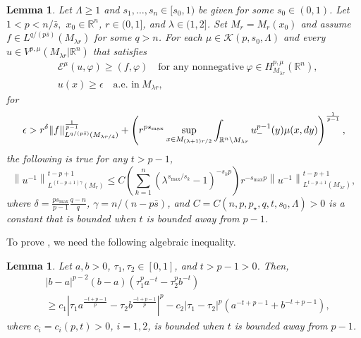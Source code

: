 \documentclass[11pt]{amsart}
\theoremstyle{plain}
\newtheorem{lemma}[theorem]{Lemma}
\theoremstyle{definition}
\numberwithin{equation}{section}
\renewcommand{\d}{\textnormal{d}}
\newcommand{\R}{\mathbb{R}}
\begin{document}
\begin{lemma} \label{lem:iteration}
Let $\Lambda \ge 1$ and $s_1,\dots,s_n\in[s_0,1)$ be given for some $s_0\in(0,1)$. Let $1<p<  n/\bar{s},$ $x_0 \in \R^n$, $r\in(0,1]$, and $\lambda \in (1,2]$. Set $M_r = M_r(x_0)$ and assume $f\in L^{q/(p\bar{s})}(M_{\lambda r})$ for some $q>n$. 
For each $\mu \in \mathcal{K}(p,s_0, \Lambda)$ and every $u \in V^{p,\mu}(M_{\lambda r} | \R^n)$ that satisfies 
\begin{align*}
&\mathcal{E}^\mu(u, \varphi) \geq (f, \varphi) \quad \text{for any nonnegative}~ \varphi \in H^{p,\mu}_{M_{\lambda r}}(\R^n), \\
&u(x) \geq \epsilon \quad \text{a.e. in}~ M_{\lambda r},
\end{align*}
for
\begin{equation*}
\epsilon > r^{\delta}\|f\|_{L^{q/(p\bar{s})}(M_{\lambda r/4})}^{\frac{1}{p-1}} + \left( r^{ps_{\max}} \sup_{x \in M_{(\lambda+1)r/2}} \int_{\mathbb{R}^n \setminus M_{\lambda r}} u_-^{p-1}(y) \mu(x, \d y) \right)^{\frac{1}{p-1}},
\end{equation*}
the following is true for any $t > p-1$,
\begin{equation*}
\left\|u^{-1}\right\|_{L^{(t-p+1)\gamma}(M_r)}^{t-p+1} \leq C \left( \sum_{k=1}^n \left( \lambda^{s_{\max}/s_k}-1 \right)^{-s_k p} \right) r^{-s_{\max}p} \left\|u^{-1}\right\|_{L^{t-p+1}(M_{\lambda r})}^{t-p+1},
\end{equation*}
where $\delta = \frac{ps_{\max}}{p-1} \frac{q-n}{q}$, $\gamma = n/(n-p\bar{s})$, and $C = C(n, p, p_{\star}, q, t, s_0, \Lambda) > 0$ is a constant that is bounded when $t$ is bounded away from $p-1$.
\end{lemma}

To prove , we need the following algebraic inequality.

\begin{lemma} \label{lem:alg_ineq}
Let $a, b > 0$, $\tau_1, \tau_2 \in [0,1]$, and $t > p-1 > 0$. Then,
\begin{equation*}
\begin{split}
&|b-a|^{p-2}(b-a)(\tau_1^p a^{-t} - \tau_2^p b^{-t}) \\
&\geq c_1 \left| \tau_1 a^{\frac{-t+p-1}{p}} - \tau_2 b^{\frac{-t+p-1}{p}} \right|^p - c_2 |\tau_1-\tau_2|^p \left( a^{-t+p-1} + b^{-t+p-1} \right),
\end{split}
\end{equation*}
where $c_i = c_i(p, t) > 0$, $i=1, 2$, is bounded when $t$ is bounded away from $p-1$.
\end{lemma}
\end{document}
